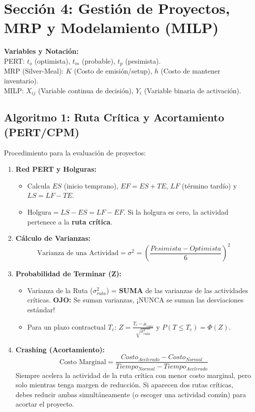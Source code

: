 \section{Sección 4: Gestión de Proyectos, MRP y Modelamiento (MILP)}

\begin{tcolorbox}[colback=blue!5!white,colframe=blue!60!black,title=Parámetros del Modelo]
\textbf{Variables y Notación:}\\
PERT: $t_o$ (optimista), $t_m$ (probable), $t_p$ (pesimista).\\
MRP (Silver-Meal): $K$ (Costo de emisión/setup), $h$ (Costo de mantener inventario).\\
MILP: $X_{ij}$ (Variable continua de decisión), $Y_i$ (Variable binaria de activación).
\end{tcolorbox}

\subsection{Algoritmo 1: Ruta Crítica y Acortamiento (PERT/CPM)}
Procedimiento para la evaluación de proyectos:

\begin{enumerate}
    \item \textbf{Red PERT y Holguras:} 
    \begin{itemize}
        \item Calcula $ES$ (inicio temprano), $EF=ES+TE$, $LF$ (término tardío) y $LS=LF-TE$.
        \item $\text{Holgura}=LS-ES=LF-EF$. Si la holgura es cero, la actividad pertenece a la
        \textbf{ruta crítica}.
    \end{itemize}
    \item \textbf{Cálculo de Varianzas:} 
    $$ \text{Varianza de una Actividad} = \sigma^2 = \left( \frac{Pesimista - Optimista}{6} \right)^2 $$
    \item \textbf{Probabilidad de Terminar (Z):}
    \begin{itemize}
        \item Varianza de la Ruta ($\sigma^2_{ruta}$) = \textbf{SUMA} de las varianzas de las actividades críticas. \textbf{OJO:} Se suman varianzas, ¡NUNCA se suman las desviaciones estándar!
        \item Para un plazo contractual $T_c$:
        $Z = \frac{T_c - \mu_{ruta}}{\sqrt{\sigma^2_{ruta}}}$ y
        $P(T\le T_c)=\Phi(Z)$.
    \end{itemize}
    \item \textbf{Crashing (Acortamiento):} 
    $$ \text{Costo Marginal} = \frac{Costo_{Acelerado} - Costo_{Normal}}{Tiempo_{Normal} - Tiempo_{Acelerado}} $$
    Siempre acelera la actividad de la ruta crítica con menor costo marginal,
    pero solo mientras tenga margen de reducción. Si aparecen dos rutas críticas,
    debes reducir ambas simultáneamente (o escoger una actividad común) para
    acortar el proyecto.
\end{enumerate}

